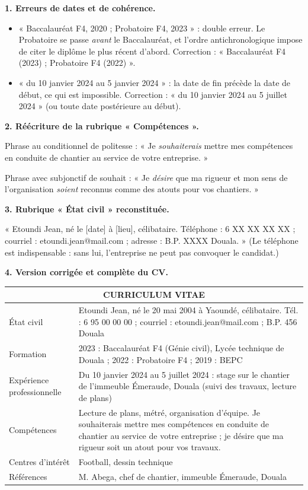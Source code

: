 \documentclass[11pt]{article}
\begin{document}
\begin{corrige}
\textbf{1. Erreurs de dates et de cohérence.}
\begin{itemize}
\item « Baccalauréat F4, 2020 ; Probatoire F4, 2023 » : double erreur. Le Probatoire se passe \emph{avant} le Baccalauréat, et l'ordre antichronologique impose de citer le diplôme le plus récent d'abord. Correction : « Baccalauréat F4 (2023) ; Probatoire F4 (2022) ».
\item « du 10 janvier 2024 au 5 janvier 2024 » : la date de fin précède la date de début, ce qui est impossible. Correction : « du 10 janvier 2024 au 5 juillet 2024 » (ou toute date postérieure au début).
\end{itemize}

\textbf{2. Réécriture de la rubrique « Compétences ».}

Phrase au conditionnel de politesse : « Je \emph{souhaiterais} mettre mes compétences en conduite de chantier au service de votre entreprise. »

Phrase avec subjonctif de souhait : « Je \emph{désire} que ma rigueur et mon sens de l'organisation \emph{soient} reconnus comme des atouts pour vos chantiers. »

\textbf{3. Rubrique « État civil » reconstituée.}

« Etoundi Jean, né le [date] à [lieu], célibataire. Téléphone : 6 XX XX XX XX ; courriel : etoundi.jean@mail.com ; adresse : B.P. XXXX Douala. » (Le téléphone est indispensable : sans lui, l'entreprise ne peut pas convoquer le candidat.)

\textbf{4. Version corrigée et complète du CV.}

\begin{center}
\begin{tabularx}{\linewidth}{|l|X|}
\hline
\multicolumn{2}{|c|}{\textbf{CURRICULUM VITAE}} \\
\hline
État civil & Etoundi Jean, né le 20 mai 2004 à Yaoundé, célibataire. Tél. : 6 95 00 00 00 ; courriel : etoundi.jean@mail.com ; B.P. 456 Douala \\
\hline
Formation & 2023 : Baccalauréat F4 (Génie civil), Lycée technique de Douala ; 2022 : Probatoire F4 ; 2019 : BEPC \\
\hline
Expérience professionnelle & Du 10 janvier 2024 au 5 juillet 2024 : stage sur le chantier de l'immeuble Émeraude, Douala (suivi des travaux, lecture de plans) \\
\hline
Compétences & Lecture de plans, métré, organisation d'équipe. Je souhaiterais mettre mes compétences en conduite de chantier au service de votre entreprise ; je désire que ma rigueur soit un atout pour vos travaux. \\
\hline
Centres d'intérêt & Football, dessin technique \\
\hline
Références & M. Abega, chef de chantier, immeuble Émeraude, Douala \\
\hline
\end{tabularx}
\end{center}


\end{corrige}
\end{document}
